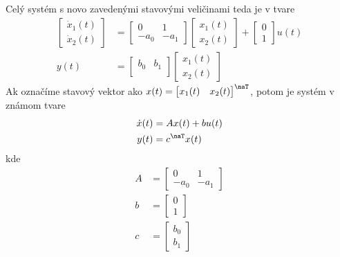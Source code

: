 \documentclass[a4paper, 10pt, ]{article}
\begin{document}
Celý systém s novo zavedenými stavovými veličinami teda je v tvare
\begin{align}
	\begin{bmatrix}
    	  \dot x_1(t) \\
		  \dot x_2(t)
 	\end{bmatrix}
	&=
	\begin{bmatrix}
    	0 & 1 \\
    	- a_0 & - a_1
  	\end{bmatrix}
    \begin{bmatrix}
    	  x_1(t) \\
		  x_2(t)
 	\end{bmatrix}
    +
    \begin{bmatrix}
    	  0 \\
		  1
 	\end{bmatrix}
    u(t)
    \\
    y(t)
    &=
    \begin{bmatrix}
        b_0 & b_1 \\
    \end{bmatrix}
    \begin{bmatrix}
          x_1(t) \\
          x_2(t)
    \end{bmatrix}
\end{align}
Ak označíme stavový vektor ako $x(t) = \begin{bmatrix} x_1(t) & x_2(t) \end{bmatrix}^\naT$, potom je systém v známom tvare
\begin{subequations} \label{susDifRovnicPreODE}
    \begin{align}
    	\dot x(t) &= A x(t) + b u(t) \\
        y(t) &= c^\naT x(t)
    \end{align}
\end{subequations}
kde
\begin{subequations}
\begin{align}
    A &=
    \begin{bmatrix}
    	0 & 1 \\
    	- a_0 & - a_1
  	\end{bmatrix}
    \\
    b &=
    \begin{bmatrix}
    	  0 \\
          1
 	\end{bmatrix}
    \\
    c &=
    \begin{bmatrix}
        b_0 \\ b_1 
    \end{bmatrix}
\end{align}
\end{subequations}
\end{document}
